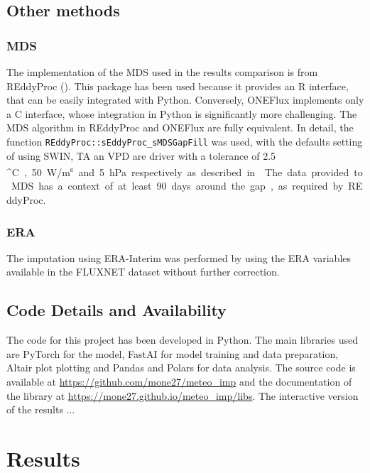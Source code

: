 \documentclass{article}
\let\Oldsection\section
\renewcommand{\section}{\FloatBarrier\Oldsection}
\let\Oldsubsection\subsection
\renewcommand{\subsection}{\FloatBarrier\Oldsubsection}
\begin{document}
\subsection{Other methods}

\subsubsection{MDS}

The implementation of the MDS used in the results comparison is from REddyProc (\cite{wutzler_basic_2018}). This package has been used because it provides an R interface, that can be easily integrated with Python. Conversely, ONEFlux implements only a C interface, whose integration in Python is significantly more challenging.  The MDS algorithm in REddyProc and ONEFlux are fully equivalent. In detail, the function \verb|REddyProc::sEddyProc_sMDSGapFill| was used, with the defaults setting of using SW\textunderscore IN, TA an VPD are driver with a tolerance of 2.5 \si{^\circ C}, 50 \si{W/m^s} and 5 \si{hPa} respectively as described in \cite{reichstein_separation_2005}.
The data provided to MDS has a context of at least 90 days around the gap, as required by REddyProc. 

\subsubsection{ERA} The imputation using ERA-Interim was performed by using the ERA variables available in the FLUXNET dataset without further correction.

\subsection{Code Details and Availability}

The code for this project has been developed in Python. The main libraries used are PyTorch for the model,  FastAI for model training and data preparation, Altair plot plotting and Pandas and Polars for data analysis. The source code is available at \url{https://github.com/mone27/meteo_imp} and the documentation of the library at \url{https://mone27.github.io/meteo_imp/libs}. %
The interactive version of the results ...
\pagebreak

\section{Results}
\end{document}
